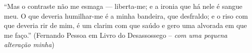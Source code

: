 

\begin{epigrafe}
    \vspace*{\fill}
	{
		\noindent\hspace{.5\textwidth}
		{\begin{minipage}{.5\textwidth}
			\begin{flushright}
				``Mas o contraste não me esmaga — liberta-me; e a ironia que há nele é sangue meu. O que deveria humilhar-me é a
				minha bandeira, que desfraldo; e o riso com que deveria rir
				de mim, é um clarim com que saúdo e gero uma alvorada em
				que me faço.'' (Fernando Pessoa em Livro do Desassossego -- \emph{com uma pequena alteração minha})
			\end{flushright}
		\end{minipage}}%
		\vspace*{3cm}
	}
\end{epigrafe}
